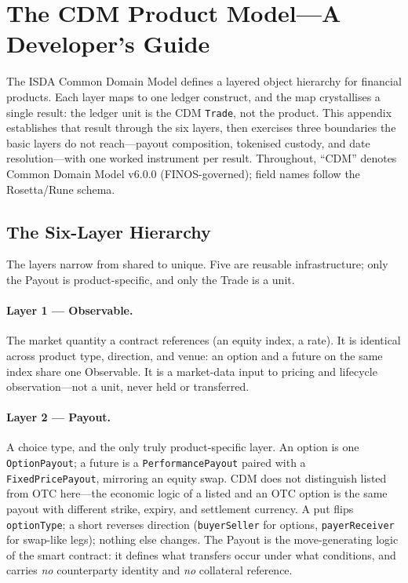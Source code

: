 \section{The CDM Product Model---A Developer's Guide}
\label{sec:appF}
\label{app:cdm-walkthrough}

The ISDA Common Domain Model defines a layered object hierarchy for financial products. Each layer maps to one ledger construct, and the map crystallises a single result: the ledger unit is the CDM \texttt{Trade}, not the product. This appendix establishes that result through the six layers, then exercises three boundaries the basic layers do not reach---payout composition, tokenised custody, and date resolution---with one worked instrument per result. Throughout, ``CDM'' denotes Common Domain Model v6.0.0 (FINOS-governed); field names follow the Rosetta/Rune schema.

\subsection{The Six-Layer Hierarchy}
\label{sec:cdm-layers}

The layers narrow from shared to unique. Five are reusable infrastructure; only the Payout is product-specific, and only the Trade is a unit.

\paragraph{Layer 1 --- Observable.} The market quantity a contract references (an equity index, a rate). It is identical across product type, direction, and venue: an option and a future on the same index share one Observable. It is a market-data input to pricing and lifecycle observation---not a unit, never held or transferred.

\paragraph{Layer 2 --- Payout.} A choice type, and the only truly product-specific layer. An option is one \texttt{OptionPayout}; a future is a \texttt{PerformancePayout} paired with a \texttt{FixedPricePayout}, mirroring an equity swap. CDM does not distinguish listed from OTC here---the economic logic of a listed and an OTC option is the same payout with different strike, expiry, and settlement currency. A put flips \texttt{optionType}; a short reverses direction (\texttt{buyerSeller} for options, \texttt{payerReceiver} for swap-like legs); nothing else changes. The Payout is the move-generating logic of the smart contract: it defines what transfers occur under what conditions, and carries \emph{no} counterparty identity and \emph{no} collateral reference.


